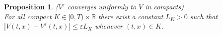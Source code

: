 \documentclass{tufte-handout}
\newcommand{\E}{\mathbb{E}} %
\renewcommand{\Pr}{\mathbb{P}} %
\newcommand{\R}{\mathbb{R}} %
\newtheorem{pr}{Proposition}
\begin{document}
%		
		
	\begin{pr}($V^{\varepsilon}$ converges uniformly to $V$ in compacts) \label{pr:V^eps->V}\\
		For all compact $K \in [0, T)\times\R$ there exist a constant $L_K > 0$ such that $|V(t, x) - V^{\varepsilon}(t, x)| \leq \varepsilon L_K$ whenever $(t, x) \in K$.
	\end{pr}
	
\end{document}
